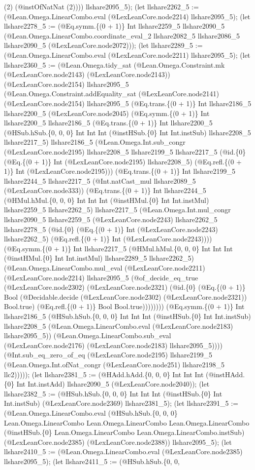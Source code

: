 \documentclass[11pt]{article}
\begin{document}
(2) (@instOfNatNat (2)))) llshare2095\_5); (let llshare2262\_5 := (@Lean.Omega.LinearCombo.eval (@LexLeanCore.node2214) llshare2095\_5); (let llshare2278\_5 := (@Eq.symm.\{(0 + 1)\} Int llshare2259\_5 llshare2090\_5 (@Lean.Omega.LinearCombo.coordinate\_eval\_2 llshare2082\_5 llshare2086\_5 llshare2090\_5 (@LexLeanCore.node2072))); (let llshare2289\_5 := (@Lean.Omega.LinearCombo.eval (@LexLeanCore.node2211) llshare2095\_5); (let llshare2360\_5 := (@Lean.Omega.tidy\_sat (@Lean.Omega.Constraint.mk (@LexLeanCore.node2143) (@LexLeanCore.node2143)) (@LexLeanCore.node2154) llshare2095\_5 (@Lean.Omega.Constraint.addEquality\_sat (@LexLeanCore.node2141) (@LexLeanCore.node2154) llshare2095\_5 (@Eq.trans.\{(0 + 1)\} Int llshare2186\_5 llshare2200\_5 (@LexLeanCore.node2045) (@Eq.symm.\{(0 + 1)\} Int llshare2200\_5 llshare2186\_5 (@Eq.trans.\{(0 + 1)\} Int llshare2200\_5 (@HSub.hSub.\{0, 0, 0\} Int Int Int (@instHSub.\{0\} Int Int.instSub) llshare2208\_5 llshare2217\_5) llshare2186\_5 (@Lean.Omega.Int.sub\_congr (@LexLeanCore.node2195) llshare2208\_5 llshare2199\_5 llshare2217\_5 (@id.\{0\} (@Eq.\{(0 + 1)\} Int (@LexLeanCore.node2195) llshare2208\_5) (@Eq.refl.\{(0 + 1)\} Int (@LexLeanCore.node2195))) (@Eq.trans.\{(0 + 1)\} Int llshare2199\_5 llshare2244\_5 llshare2217\_5 (@Int.natCast\_mul llshare2089\_5 (@LexLeanCore.node333)) (@Eq.trans.\{(0 + 1)\} Int llshare2244\_5 (@HMul.hMul.\{0, 0, 0\} Int Int Int (@instHMul.\{0\} Int Int.instMul) llshare2259\_5 llshare2262\_5) llshare2217\_5 (@Lean.Omega.Int.mul\_congr llshare2090\_5 llshare2259\_5 (@LexLeanCore.node2243) llshare2262\_5 llshare2278\_5 (@id.\{0\} (@Eq.\{(0 + 1)\} Int (@LexLeanCore.node2243) llshare2262\_5) (@Eq.refl.\{(0 + 1)\} Int (@LexLeanCore.node2243)))) (@Eq.symm.\{(0 + 1)\} Int llshare2217\_5 (@HMul.hMul.\{0, 0, 0\} Int Int Int (@instHMul.\{0\} Int Int.instMul) llshare2289\_5 llshare2262\_5) (@Lean.Omega.LinearCombo.mul\_eval (@LexLeanCore.node2211) (@LexLeanCore.node2214) llshare2095\_5 (@of\_decide\_eq\_true (@LexLeanCore.node2302) (@LexLeanCore.node2321) (@id.\{0\} (@Eq.\{(0 + 1)\} Bool (@Decidable.decide (@LexLeanCore.node2302) (@LexLeanCore.node2321)) Bool.true) (@Eq.refl.\{(0 + 1)\} Bool Bool.true)))))))) (@Eq.symm.\{(0 + 1)\} Int llshare2186\_5 (@HSub.hSub.\{0, 0, 0\} Int Int Int (@instHSub.\{0\} Int Int.instSub) llshare2208\_5 (@Lean.Omega.LinearCombo.eval (@LexLeanCore.node2183) llshare2095\_5)) (@Lean.Omega.LinearCombo.sub\_eval (@LexLeanCore.node2176) (@LexLeanCore.node2183) llshare2095\_5)))) (@Int.sub\_eq\_zero\_of\_eq (@LexLeanCore.node2195) llshare2199\_5 (@Lean.Omega.Int.ofNat\_congr (@LexLeanCore.node251) llshare2198\_5 llc2))))); (let llshare2381\_5 := (@HAdd.hAdd.\{0, 0, 0\} Int Int Int (@instHAdd.\{0\} Int Int.instAdd) llshare2090\_5 (@LexLeanCore.node2040)); (let llshare2382\_5 := (@HSub.hSub.\{0, 0, 0\} Int Int Int (@instHSub.\{0\} Int Int.instSub) (@LexLeanCore.node2369) llshare2381\_5); (let llshare2391\_5 := (@Lean.Omega.LinearCombo.eval (@HSub.hSub.\{0, 0, 0\} Lean.Omega.LinearCombo Lean.Omega.LinearCombo Lean.Omega.LinearCombo (@instHSub.\{0\} Lean.Omega.LinearCombo Lean.Omega.LinearCombo.instSub) (@LexLeanCore.node2385) (@LexLeanCore.node2388)) llshare2095\_5); (let llshare2410\_5 := (@Lean.Omega.LinearCombo.eval (@LexLeanCore.node2385) llshare2095\_5); (let llshare2411\_5 := (@HSub.hSub.\{0, 0, 
\end{document}
